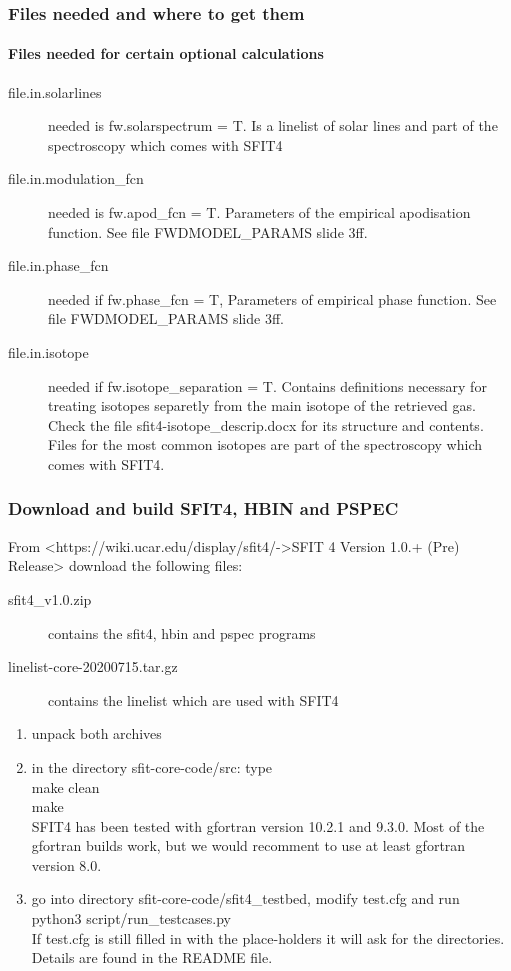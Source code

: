 \documentclass[notes=hide]{beamer}
\begin{document}
\begin{frame}
  \frametitle{Files needed and where to get them}
  \framesubtitle{Files needed for certain optional calculations}
  \begin{description}
  \item[file.in.solarlines] needed is fw.solarspectrum = T. Is a
    linelist of solar lines and part of the spectroscopy which comes
    with SFIT4
  \item[file.in.modulation\_fcn] needed is fw.apod\_fcn =
    T. Parameters of the empirical apodisation function. See file
    FWDMODEL\_PARAMS slide 3ff.
  \item[file.in.phase\_fcn] needed if fw.phase\_fcn = T, Parameters of
    empirical phase function. See file
    FWDMODEL\_PARAMS slide 3ff. 
  \item[file.in.isotope] needed if fw.isotope\_separation =
    T. Contains definitions necessary for treating isotopes separetly
    from the main isotope of the retrieved gas. Check the file
    sfit4-isotope\_descrip.docx for its structure and
    contents. Files for the most common isotopes are part of the
    spectroscopy which comes with SFIT4.
  \end{description}
\end{frame}

\begin{frame}
  \frametitle{Download and build SFIT4, HBIN and PSPEC}
  From <https://wiki.ucar.edu/display/sfit4/->SFIT 4 Version 1.0.+
  (Pre) Release> download the following files:
  \begin{description}
  \item [sfit4\_v1.0.zip] contains the sfit4, hbin and pspec programs
  \item[linelist-core-20200715.tar.gz]  contains the linelist which
    are used with SFIT4
  \end{description}
  \begin{enumerate}
  \item unpack both archives
  \item in the directory sfit-core-code/src: type\\
    make clean\\
    make\\
    SFIT4 has been tested with gfortran version 10.2.1 and 9.3.0. Most
    of the gfortran builds work, but we would recomment to use at
    least gfortran version 8.0.
  \item go into directory sfit-core-code/sfit4\_testbed, modify
    test.cfg and run\\
    python3
    script/run\_testcases.py\\
    If test.cfg is still filled in with the place-holders it will ask
    for the directories. Details are found in the README file.
  \end{enumerate}
\end{frame}
\end{document}
